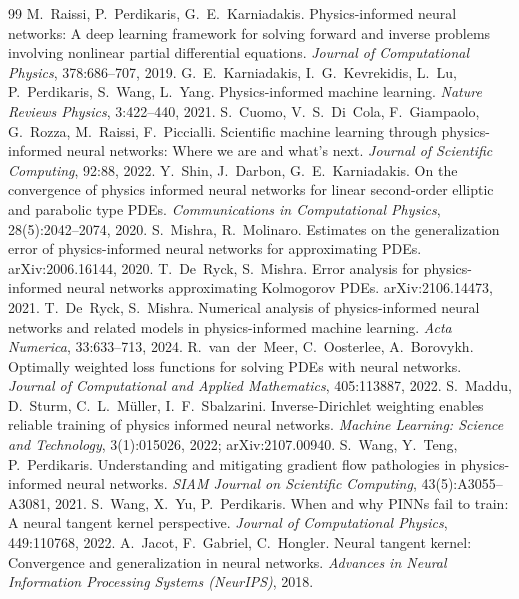 \documentclass[fontset=windows,11pt]{ctexart}
\numberwithin{equation}{section}
\begin{document}
\begin{thebibliography}{99}\small
{} M.~Raissi, P.~Perdikaris, G.~E.~Karniadakis. Physics-informed neural networks: A deep learning framework for solving forward and inverse problems involving nonlinear partial differential equations. \emph{Journal of Computational Physics}, 378:686--707, 2019.
 G.~E.~Karniadakis, I.~G.~Kevrekidis, L.~Lu, P.~Perdikaris, S.~Wang, L.~Yang. Physics-informed machine learning. \emph{Nature Reviews Physics}, 3:422--440, 2021.
 S.~Cuomo, V.~S.~Di~Cola, F.~Giampaolo, G.~Rozza, M.~Raissi, F.~Piccialli. Scientific machine learning through physics-informed neural networks: Where we are and what's next. \emph{Journal of Scientific Computing}, 92:88, 2022.
 Y.~Shin, J.~Darbon, G.~E.~Karniadakis. On the convergence of physics informed neural networks for linear second-order elliptic and parabolic type PDEs. \emph{Communications in Computational Physics}, 28(5):2042--2074, 2020.
 S.~Mishra, R.~Molinaro. Estimates on the generalization error of physics-informed neural networks for approximating PDEs. arXiv:2006.16144, 2020.
 T.~De~Ryck, S.~Mishra. Error analysis for physics-informed neural networks approximating Kolmogorov PDEs. arXiv:2106.14473, 2021.
 T.~De~Ryck, S.~Mishra. Numerical analysis of physics-informed neural networks and related models in physics-informed machine learning. \emph{Acta Numerica}, 33:633--713, 2024.
 R.~van~der~Meer, C.~Oosterlee, A.~Borovykh. Optimally weighted loss functions for solving PDEs with neural networks. \emph{Journal of Computational and Applied Mathematics}, 405:113887, 2022.
 S.~Maddu, D.~Sturm, C.~L.~M\"uller, I.~F.~Sbalzarini. Inverse-Dirichlet weighting enables reliable training of physics informed neural networks. \emph{Machine Learning: Science and Technology}, 3(1):015026, 2022; arXiv:2107.00940.
 S.~Wang, Y.~Teng, P.~Perdikaris. Understanding and mitigating gradient flow pathologies in physics-informed neural networks. \emph{SIAM Journal on Scientific Computing}, 43(5):A3055--A3081, 2021.
 S.~Wang, X.~Yu, P.~Perdikaris. When and why PINNs fail to train: A neural tangent kernel perspective. \emph{Journal of Computational Physics}, 449:110768, 2022.
 A.~Jacot, F.~Gabriel, C.~Hongler. Neural tangent kernel: Convergence and generalization in neural networks. \emph{Advances in Neural Information Processing Systems (NeurIPS)}, 2018.

\end{thebibliography}
\end{document}

